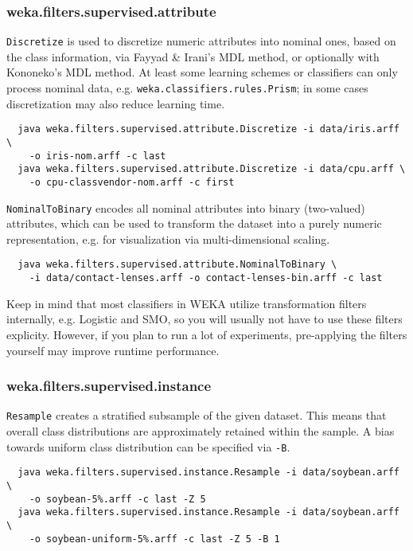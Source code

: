 \subsubsection*{weka.filters.supervised.attribute}

\texttt{Discretize} is used to discretize numeric attributes into nominal ones, based on the class information, via Fayyad \& Irani's MDL method, or optionally with Kononeko's MDL method. At least some learning schemes or classifiers can only process nominal data, e.g. \texttt{weka.classifiers.rules.Prism}; in some cases discretization may also reduce learning time.

{\scriptsize
\begin{verbatim}
  java weka.filters.supervised.attribute.Discretize -i data/iris.arff \
    -o iris-nom.arff -c last
  java weka.filters.supervised.attribute.Discretize -i data/cpu.arff \
    -o cpu-classvendor-nom.arff -c first
\end{verbatim}}

\noindent \texttt{NominalToBinary} encodes all nominal attributes into binary (two-valued) attributes, which can be used to transform the dataset into a purely numeric representation, e.g. for visualization via multi-dimensional scaling.

{\scriptsize
\begin{verbatim}
  java weka.filters.supervised.attribute.NominalToBinary \
    -i data/contact-lenses.arff -o contact-lenses-bin.arff -c last
\end{verbatim}}

\noindent Keep in mind that most classifiers in WEKA utilize transformation filters internally, e.g. Logistic and SMO, so you will usually not have to use these filters explicity. However, if you plan to run a lot of experiments, pre-applying the filters yourself may improve runtime performance.

\subsubsection*{weka.filters.supervised.instance}

\texttt{Resample} creates a stratified subsample of the given dataset. This means that overall class distributions are approximately retained within the sample. A bias towards uniform class distribution can be specified via \texttt{-B}.

{\scriptsize
\begin{verbatim}
  java weka.filters.supervised.instance.Resample -i data/soybean.arff \
    -o soybean-5%.arff -c last -Z 5
  java weka.filters.supervised.instance.Resample -i data/soybean.arff \
    -o soybean-uniform-5%.arff -c last -Z 5 -B 1
\end{verbatim}}


